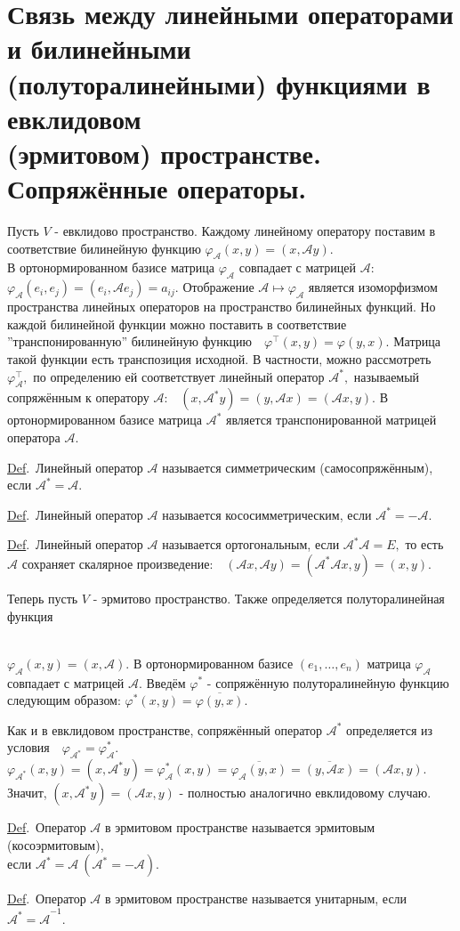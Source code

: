 \documentclass[draft]{article}%
\newcommand{\de}{\par\noindent\underline{Def}.\ }%
\newcommand{\ab}{\par\noindent}%
\renewcommand{\phi}{\varphi}
\newcommand{\baz}[1]{\left(#1_1,\dots,#1_n\right)}%
\newcommand{\op}[1]{$\mathcal{#1}$}
\newcommand{\om}[1]{\mathcal{#1}}
\begin{document}
\section{Связь между линейными операторами и билинейными\\ (полуторалинейными) функциями в евклидовом\\
(эрмитовом) пространстве. Сопряжённые операторы.} %
\label{q28} %
Пусть $V$ - евклидово пространство. Каждому линейному оператору поставим в соответствие билинейную функцию
$\phi_{\om{A}}(x,y)=(x,\om{A}y).$\\ В ортонормированном базисе матрица $\phi_{\om{A}}$ совпадает с матрицей
$\om{A}$: $\phi_{\om{A}}(e_i,e_j)=(e_i,\om{A}e_j)=a_{ij}.$ %
Отображение $\om{A}\mapsto\phi_{\om{A}}$ является изоморфизмом пространства линейных операторов на пространство
билинейных функций. Но каждой билинейной функции можно поставить в соответствие ''транспонированную''
билинейную функцию\ \ $\phi^\top(x,y)=\phi(y,x).$ Матрица такой функции есть транспозиция исходной. В
частности, можно рассмотреть $\phi_{\om{A}}^\top,$ по определению ей соответствует линейный оператор $\om{A}^*,$
называемый сопряжённым к оператору \op{A}:\ \  $(x,\om{A}^*y)=(y,\om{A}x)=(\om{A}x,y).$ В ортонормированном
базисе матрица \op{A^*} является транспонированной матрицей оператора \op{A}. %
\de Линейный оператор $\om{A}$ называется симметрическим (самосопряжённым), если $\om{A^*=A}.$ %
\de Линейный оператор $\om{A}$ называется кососимметрическим, если $\om{A^*=-A}.$ %
\de Линейный оператор $\om{A}$ называется ортогональным, если $\om{A^*A}=E,$ то есть $\om{A}$ сохраняет
скалярное произведение:\ \ $(\om{A}x,\om{A}y)=(\om{A^*A}x,y)=(x,y).$ %
\ab Теперь пусть $V$ - эрмитово пространство. Также определяется полуторалинейная функция \rule{0pt}{15pt}\\
$\phi_{\om{A}}(x,y)=(x,\om{A}).$ В ортонормированном базисе $\baz{e}$ матрица $\phi_{\om{A}}$ совпадает с матрицей
$\om{A}$. Введём $\phi^*$ - сопряжённую полуторалинейную функцию следующим образом:
$\phi^*(x,y)=\overline{\phi(y,x)}.$ %
\ab Как и в евклидовом пространстве, сопряжённый оператор \op{A^*} определяется из условия\ \
$\phi_{\om{A^*}}=\phi^*_{\om{A}}.$
$\phi_{\om{A^*}}(x,y)=(x,\om{A^*}y)=\phi^*_{\om{A}}(x,y)=\overline{\phi_{\om{A}}(y,x)}=\overline{(y,\om{A}x)}=(\om{A}x,y).$
\\Значит, $(x,\om{A^*}y)=(\om{A}x,y)$ - полностью аналогично евклидовому случаю.
\de Оператор $\om{A}$ в эрмитовом пространстве называется эрмитовым (косоэрмитовым),\\ если $\om{A^*=A}\
(\om{A^*=-A}).$ %
\de Оператор \op{A} в эрмитовом пространстве называется унитарным, если $\om{A^*=A}^{-1}.$
\end{document}
